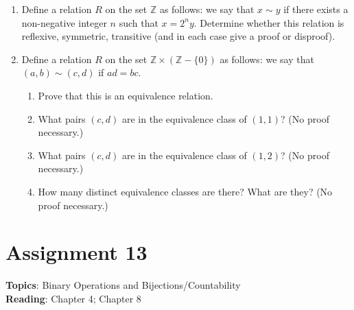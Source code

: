 \documentclass[12pt]{article}
\newcommand{\warning}{
\smallskip
\begin{center}
  {\color{red} {\huge\Stopsign} \hspace{1pt}  IN PROGRESS!} {\color{blue}Check back later for the final assignment.} {\color{red} {\huge\Stopsign} }
\end{center}
\smallskip
\AddToShipoutPictureBG*{\AtTextLowerLeft{\llap{\rotatebox[origin=lb]{90}{\large\sffamily\hspace{2.5in}
  {\color{red} {\huge\Stopsign} \hspace{1pt}  IN PROGRESS!} {\color{blue}Check back later for the final assignment.} {\color{red} {\huge\Stopsign} }
      }\quad\rule{0.8pt}{\textheight}\enspace}}}
}
\begin{document}
\begin{enumerate}
\item Define a relation $R$ on the set $\mathbb{Z}$ as follows: we say that $x \sim y$ if there exists a non-negative integer $n$ such that $x = 2^ny$. Determine whether this relation is reflexive, symmetric, transitive (and in each case give a proof or disproof).

\item 

  Define a relation $R$ on the set $\mathbb{Z}\times \left(\mathbb{Z} - \{0\}\right)$ as follows: we say that $(a,b) \sim (c,d)$ if $ad = bc$. 
 \begin{enumerate}
 \item Prove that this is an equivalence relation.
 \item What pairs $(c,d)$ are in the equivalence class of $(1,1)$? (No proof necessary.)
 \item What pairs $(c,d)$ are in the equivalence class of $(1,2)$? (No proof necessary.)   
 \item How many distinct equivalence classes are there? What are they? (No proof necessary.)
 \end{enumerate} 
  
\end{enumerate}





\newpage
\section[13 (Not to be handed in): Binary Operations and Bijections/Countability]{Assignment 13}


\noindent\textbf{Topics}: Binary Operations and Bijections/Countability
\\

\noindent \textbf{Reading}: Chapter 4; Chapter 8
\\



\end{document}
